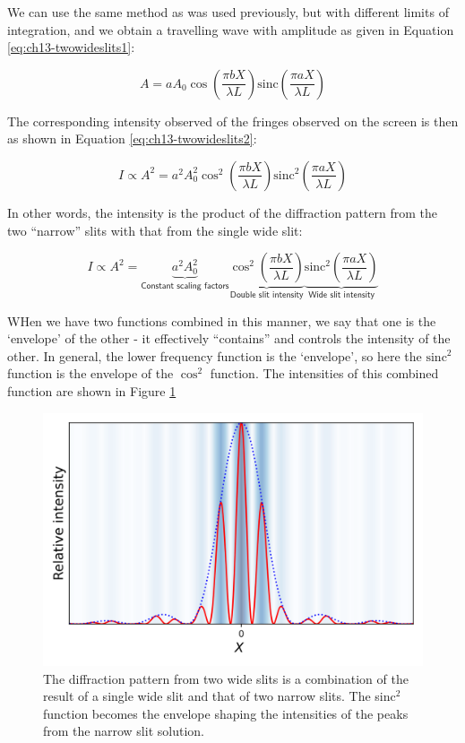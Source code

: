 \documentclass[
]{book}
\begin{document}
We can use the same method as was used previously, but with different limits of integration, and we obtain a travelling wave with amplitude as given in Equation \eqref{eq:ch13-twowideslits1}:

\begin{equation}
A = a A_0 \cos \left( \frac{\pi b X}{\lambda L} \right) \mathrm{sinc}\left( \frac{\pi a X}{\lambda L} \right)
\label{eq:ch13-twowideslits1}
\end{equation}

The corresponding intensity observed of the fringes observed on the screen is then as shown in Equation \eqref{eq:ch13-twowideslits2}:

\begin{equation}
I \propto A^2 = a^2 A_0^2 \cos^2 \left( \frac{\pi b X}{\lambda L} \right) \mathrm{sinc}^2 \left( \frac{\pi a X}{\lambda L}\right)
\label{eq:ch13-twowideslits2}
\end{equation}

In other words, the intensity is the product of the diffraction pattern from the two ``narrow'' slits with that from the single wide slit:

\begin{equation}
I \propto A^2 = \underbrace{a^2 A_0^2}_{\textsf{Constant scaling factors}} 
\underbrace{\cos^2 \left( \frac{\pi b X}{\lambda L} \right)}_{\textsf{Double slit intensity}} \underbrace{\mathrm{sinc}^2 \left( \frac{\pi a X}{\lambda L}\right)}_{\textsf{Wide slit intensity}}
\label{eq:ch13-twowideslits3}
\end{equation}

WHen we have two functions combined in this manner, we say that one is the `envelope' of the other - it effectively ``contains'' and controls the intensity of the other. In general, the lower frequency function is the `envelope', so here the \(\mathrm{sinc}^2\) function is the envelope of the \(\cos^2\) function. The intensities of this combined function are shown in Figure \ref{fig:ch13-twowideslits2}

\begin{figure}

{\centering \includegraphics[width=0.7\linewidth]{visualisations/ch13-doublewideslit1} 

}

\caption{The diffraction pattern from two wide slits is a combination of the result of a single wide slit and that of two narrow slits. The sinc$^{2}$ function becomes the envelope shaping the intensities of the peaks from the narrow slit solution.}\label{fig:ch13-twowideslits2}
\end{figure}
\end{document}
